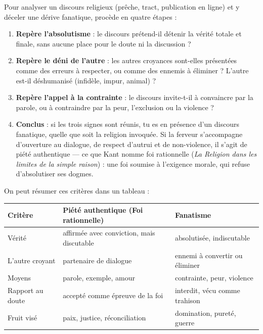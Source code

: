 \documentclass[11pt]{article}
\newcommand{\cle}[1]{{\popxbold\color{popdark}#1}}
\begin{document}
\begin{methode}
Pour analyser un discours religieux (prêche, tract, publication en ligne) et y déceler une dérive fanatique, procède en quatre étapes :
\begin{enumerate}
\item \textbf{Repère l'absolutisme} : le discours prétend-il détenir la vérité totale et finale, sans aucune place pour le doute ni la discussion ?
\item \textbf{Repère le déni de l'autre} : les autres croyances sont-elles présentées comme des erreurs à respecter, ou comme des ennemis à éliminer ? L'autre est-il déshumanisé (infidèle, impur, animal) ?
\item \textbf{Repère l'appel à la contrainte} : le discours invite-t-il à convaincre par la parole, ou à contraindre par la peur, l'exclusion ou la violence ?
\item \textbf{Conclus} : si les trois signes sont réunis, tu es en présence d'un discours fanatique, quelle que soit la religion invoquée. Si la ferveur s'accompagne d'ouverture au dialogue, de respect d'autrui et de non-violence, il s'agit de piété authentique — ce que Kant nomme \cle{foi rationnelle} (\emph{La Religion dans les limites de la simple raison}) : une foi soumise à l'exigence morale, qui refuse d'absolutiser ses dogmes.
\end{enumerate}
\end{methode}

On peut résumer ces critères dans un tableau :

\begin{center}
\begin{tabularx}{\linewidth}{|l|X|X|}
\hline
\rowcolor{popblueL} \textbf{Critère} & \textbf{Piété authentique (Foi rationnelle)} & \textbf{Fanatisme} \\
\hline
Vérité & affirmée avec conviction, mais discutable & absolutisée, indiscutable \\
\hline
L'autre croyant & partenaire de dialogue & ennemi à convertir ou éliminer \\
\hline
Moyens & parole, exemple, amour & contrainte, peur, violence \\
\hline
Rapport au doute & accepté comme épreuve de la foi & interdit, vécu comme trahison \\
\hline
Fruit visé & paix, justice, réconciliation & domination, pureté, guerre \\
\hline
\end{tabularx}
\end{center}
\end{document}
